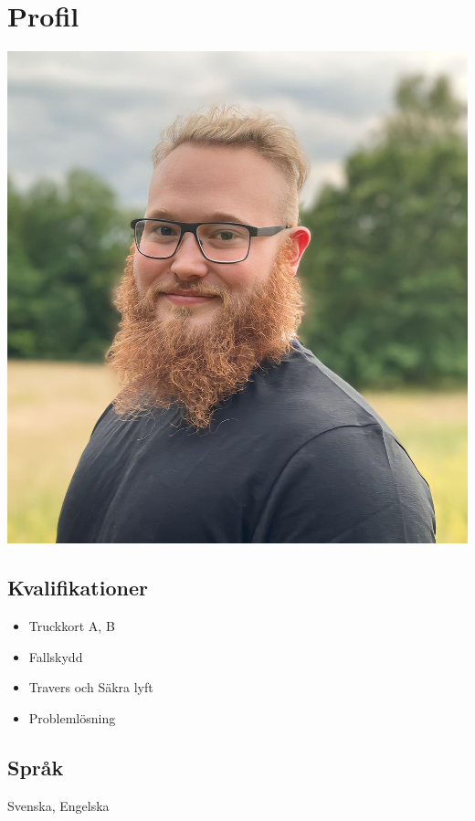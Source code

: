 \documentclass{article}
\begin{document}
	\noindent
	\begin{minipage}[t]{0.7\textwidth}
		\vspace{-20pt} %
		\section*{\textcolor{colorBlue}{Profil}}
		
	\end{minipage}%
	\hfill
	\begin{minipage}[t]{0.28\textwidth}
		\begin{minipage}[t]{0.8\textwidth}
			\vspace{-140pt} %
			\includegraphics[width=\linewidth]{../../../me.png}
			\label{fig:bild}
		\end{minipage}
		\vspace{-10pt} %
		\subsection*{\textcolor{colorBlue}{Kvalifikationer}}
		\begin{itemize}
			\item Truckkort A, B
			\item Fallskydd
			\item Travers och Säkra lyft
			\item Problemlösning
		\end{itemize}
		\vspace{-10pt} %
		\subsection*{\textcolor{colorBlue}{Språk}}
		Svenska, Engelska
	\end{minipage}
\end{document}
